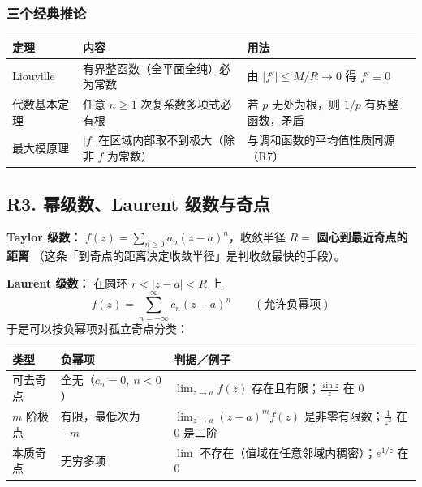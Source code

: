 \subsubsection{三个经典推论}

\begin{center}
\begin{tabular}{L{3.0cm}L{5.4cm}L{5.6cm}}
\toprule
\textbf{定理} & \textbf{内容} & \textbf{用法} \\
\midrule
Liouville & 有界整函数（全平面全纯）必为常数 &
由 $|f'|\le M/R\to0$ 得 $f'\equiv0$ \\
代数基本定理 & 任意 $n\ge1$ 次复系数多项式必有根 &
若 $p$ 无处为根，则 $1/p$ 有界整函数，矛盾 \\
最大模原理 & $|f|$ 在区域内部取不到极大（除非 $f$ 为常数） &
与调和函数的平均值性质同源（R7） \\
\bottomrule
\end{tabular}
\end{center}

\subsection{R3. 幂级数、Laurent 级数与奇点}

\textbf{Taylor 级数：} $f(z)=\sum_{n\ge0}a_n(z-a)^n$，收敛半径 $R=$ \textbf{圆心到最近奇点的距离}
（这条「到奇点的距离决定收敛半径」是判收敛最快的手段）。

\textbf{Laurent 级数：} 在圆环 $r<|z-a|<R$ 上
\[
f(z)=\sum_{n=-\infty}^{\infty}c_n(z-a)^n
\qquad(\text{允许负幂项})
\]
于是可以按负幂项对孤立奇点分类：

\begin{center}
\begin{tabular}{L{2.6cm}L{5.2cm}L{6.2cm}}
\toprule
\textbf{类型} & \textbf{负幂项} & \textbf{判据／例子} \\
\midrule
可去奇点 & 全无（$c_n=0,\ n<0$） & $\lim_{z\to a}f(z)$ 存在且有限；$\frac{\sin z}{z}$ 在 $0$ \\
$m$ 阶极点 & 有限，最低次为 $-m$ & $\lim_{z\to a}(z-a)^mf(z)$ 是非零有限数；$\frac{1}{z^2}$ 在 $0$ 是二阶 \\
本质奇点 & 无穷多项 & $\lim$ 不存在（值域在任意邻域内稠密）；$e^{1/z}$ 在 $0$ \\
\bottomrule
\end{tabular}
\end{center}

